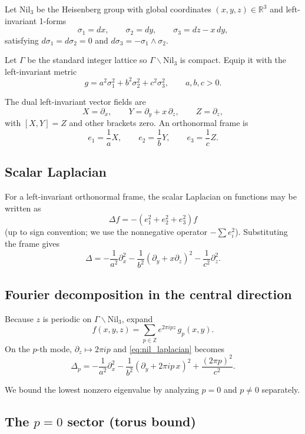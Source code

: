 \documentclass[11pt]{article}
\begin{document}
Let $\mathrm{Nil}_3$ be the Heisenberg group with global coordinates $(x,y,z)\in\mathbb{R}^3$
and left-invariant 1-forms
\[
\sigma_1 = dx,\qquad
\sigma_2 = dy,\qquad
\sigma_3 = dz - x\,dy,
\]
satisfying $d\sigma_1=d\sigma_2=0$ and $d\sigma_3=-\sigma_1\wedge\sigma_2$.

Let $\Gamma$ be the standard integer lattice so $\Gamma\backslash\mathrm{Nil}_3$ is compact.
Equip it with the left-invariant metric
\[
g = a^2\sigma_1^2 + b^2\sigma_2^2 + c^2\sigma_3^2,
\qquad a,b,c>0.
\]

The dual left-invariant vector fields are
\[
X=\partial_x,\qquad
Y=\partial_y + x\,\partial_z,\qquad
Z=\partial_z,
\]
with $[X,Y]=Z$ and other brackets zero.
An orthonormal frame is
\[
e_1=\frac{1}{a}X,\qquad e_2=\frac{1}{b}Y,\qquad e_3=\frac{1}{c}Z.
\]

\subsection{Scalar Laplacian}

For a left-invariant orthonormal frame, the scalar Laplacian on functions may be written as
\[
\Delta f = -(e_1^2+e_2^2+e_3^2)f
\]
(up to sign convention; we use the nonnegative operator $-\sum e_i^2$).
Substituting the frame gives
\begin{equation}
\Delta
=
-\frac{1}{a^2}\partial_x^2
-\frac{1}{b^2}(\partial_y + x\partial_z)^2
-\frac{1}{c^2}\partial_z^2.
\label{eq:nil_laplacian}
\end{equation}

\subsection{Fourier decomposition in the central direction}

Because $z$ is periodic on $\Gamma\backslash\mathrm{Nil}_3$, expand
\[
f(x,y,z)=\sum_{p\in\mathbb{Z}} e^{2\pi i p z}\,g_p(x,y).
\]
On the $p$-th mode, $\partial_z\mapsto 2\pi i p$ and \eqref{eq:nil_laplacian} becomes
\begin{equation}
\Delta_p
=
-\frac{1}{a^2}\partial_x^2
-\frac{1}{b^2}(\partial_y + 2\pi i p\,x)^2
+\frac{(2\pi p)^2}{c^2}.
\label{eq:nil_laplacian_p}
\end{equation}

We bound the lowest nonzero eigenvalue by analyzing $p=0$ and $p\neq 0$ separately.

\subsection{The $p=0$ sector (torus bound)}
\end{document}
